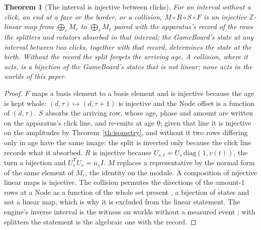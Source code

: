 \documentclass[11pt]{article}
\newtheorem{theorem}{Theorem}
\theoremstyle{definition}
\newcommand{\Z}{\mathbb{Z}}
\begin{document}
\begin{theorem}[The interval is injective between clicks]\label{th:bijection}
For an interval without a click, an end at a face or the border, or a
collision, $M \circ R \circ S \circ F$ is an injective $\Z$-linear map from $\bigoplus_r M_r$ to
$\bigoplus_r M_r$ paired with the apparatus's record of the rows the
splitters and rotators absorbed in that interval; the GameBoard's state
at any interval between two clicks, together with that record,
determines the state at the birth. Without the record the split forgets
the arriving age. A collision, where it acts, is a bijection of the
GameBoard's states that is not linear; none acts in the worlds of this
paper.
\end{theorem}
\begin{proof}
$F$ maps a basis element to a basis element and is injective because the
age is kept whole: $(d, \tau) \mapsto (d, \tau+1)$ is injective and the
Node offset is a function of $(d, \tau)$. $S$ absorbs the arriving row,
whose age, phase and amount are written on the apparatus's click line,
and re-emits at age $0$; given that line it is injective on the
amplitudes by Theorem~\ref{th:isometry}, and without it two rows
differing only in age have the same image: the split is inverted only
because the click line records what it absorbed. $R$ is injective
because $U_{s,t} = U_s\,\mathrm{diag}(1, v(t))$, the turn a bijection and
$U_s^{\mathsf T}U_s = n_s I$. $M$ replaces a
representative by the normal form of the same element of $M_r$, the
identity on the module. A composition of injective linear maps is
injective. The collision permutes the directions of the amount-$1$ rows
at a Node as a function of the whole set present \cite{beamlaw}, a
bijection of states and not a linear map, which is why it is excluded
from the linear statement. The engine's inverse interval is the witness
on worlds without a measured event \cite{beamlaw}; with splitters the
statement is the algebraic one with the record.
\end{proof}
\end{document}
